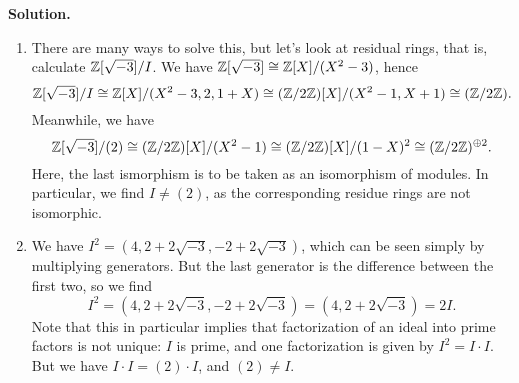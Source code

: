 \documentclass[a4paper,11pt]{article}
\begin{document}
\textbf{Solution.}
\begin{enumerate}[labelindent=0pt, wide]
    \item There are many ways to solve this, but let's look at residual rings, 
        that is, calculate $\mathbb{Z}[\sqrt{-3}]/I$. We have $\mathbb{Z}[\sqrt{-3}] \cong
        \mathbb{Z}[X]/(X^2 - 3)$, hence $$\mathbb{Z}[\sqrt{-3}]/I \cong 
        \mathbb{Z}[X]/(X^2 - 3, 2, 1+X) \cong (\mathbb{Z}/2\mathbb{Z})[X]/(X^2-1, X+1) \cong 
        (\mathbb{Z}/2\mathbb{Z}).$$
        Meanwhile, we have 
        \begin{equation*}
            \mathbb{Z}[\sqrt{-3}]/(2) \cong (\mathbb{Z}/2\mathbb{Z})[X]/(X^2 - 1) \cong 
            (\mathbb{Z}/2\mathbb{Z})[X]/(1-X)^2 \cong (\mathbb{Z}/2\mathbb{Z})^{\oplus 2}.
        \end{equation*}
        Here, the last ismorphism is to be taken as an isomorphism of modules. 
        In particular, we find $I \neq (2)$, as the corresponding residue rings
        are not isomorphic. 
    \item We have $I^2 = (4, 2 + 2 \sqrt{-3}, -2 + 2 \sqrt{-3})$, which
        can be seen simply by multiplying generators. But the last 
        generator is the difference between the first two, so we find 
        \begin{equation*}
            I^2 = (4, 2 + 2 \sqrt{-3}, -2 + 2 \sqrt{-3})
            =( 4, 2 + 2 \sqrt{-3}) = 2I.
        \end{equation*}
        Note that this in particular implies that factorization of an ideal
        into prime factors is not unique: $I$ is prime, and 
        one factorization is given by $I^2 = I\cdot I$. But we have
        $I\cdot I = (2)\cdot I$, and $(2) \neq I$.
\end{enumerate}


\contactend
\end{document}
